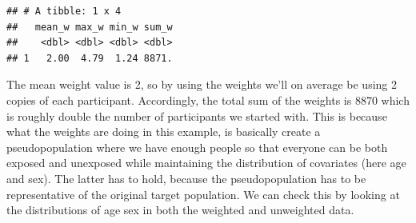 \documentclass[
]{book}
\newenvironment{Shaded}{\begin{snugshade}}{\end{snugshade}}
\newcommand{\CommentTok}[1]{\textcolor[rgb]{0.56,0.35,0.01}{\textit{#1}}}
\newcommand{\DataTypeTok}[1]{\textcolor[rgb]{0.13,0.29,0.53}{#1}}
\newcommand{\DecValTok}[1]{\textcolor[rgb]{0.00,0.00,0.81}{#1}}
\newcommand{\KeywordTok}[1]{\textcolor[rgb]{0.13,0.29,0.53}{\textbf{#1}}}
\newcommand{\NormalTok}[1]{#1}
\newcommand{\OperatorTok}[1]{\textcolor[rgb]{0.81,0.36,0.00}{\textbf{#1}}}
\newcommand{\StringTok}[1]{\textcolor[rgb]{0.31,0.60,0.02}{#1}}
\begin{document}
\begin{Shaded}
\end{Shaded}

\begin{verbatim}
## # A tibble: 1 x 4
##   mean_w max_w min_w sum_w
##    <dbl> <dbl> <dbl> <dbl>
## 1   2.00  4.79  1.24 8871.
\end{verbatim}

The mean weight value is 2, so by using the weights we'll on average be using 2 copies of each participant. Accordingly, the total sum of the weights is 8870 which is roughly double the number of participants we started with. This is because what the weights are doing in this example, is basically create a pseudopopulation where we have enough people so that everyone can be both exposed and unexposed while maintaining the distribution of covariates (here age and sex). The latter has to hold, because the pseudopopulation has to be representative of the original target population. We can check this by looking at the distributions of age sex in both the weighted and unweighted data.

\begin{Shaded}
\end{Shaded}
\end{document}
